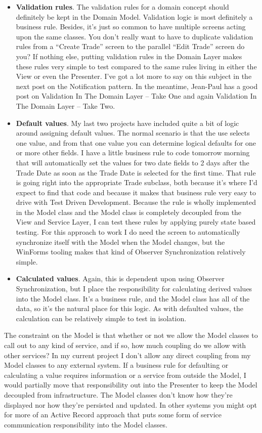 \documentclass{article}
\begin{document}
{\begin{itemize}
    \item  \textbf{Validation rules}.  The validation rules for a domain concept should definitely be kept in the Domain Model.  Validation logic is most definitely a business rule.  Besides, it's just so common to have multiple screens acting upon the same classes.  You don't really want to have to duplicate validation rules from a “Create Trade” screen to the parallel “Edit Trade” screen do you?  If nothing else, putting validation rules in the Domain Layer makes these rules very simple to test compared to the same rules living in either the View or even the Presenter.  I've got a lot more to say on this subject in the next post on the Notification pattern.  In the meantime, Jean-Paul has a good post on Validation In The Domain Layer – Take One and again Validation In The Domain Layer – Take Two.
    \item  \textbf{Default values}.  My last two projects have included quite a bit of logic around assigning default values.  The normal scenario is that the use selects one value, and from that one value you can determine logical defaults for one or more other fields.  I have a little business rule to code tomorrow morning that will automatically set the values for two date fields to 2 days after the Trade Date as soon as the Trade Date is selected for the first time.  That rule is going right into the appropriate Trade subclass, both because it's where I'd expect to find that code and because it makes that business rule very easy to drive with Test Driven Development.  Because the rule is wholly implemented in the Model class and the Model class is completely decoupled from the View and Service Layer, I can test these rules by applying purely state based testing.  For this approach to work I do need the screen to automatically synchronize itself with the Model when the Model changes, but the WinForms tooling makes that kind of Observer Synchronization relatively simple. 
    \item  \textbf{Calculated values}.  Again, this is dependent upon using Observer Synchronization, but I place the responsibility for calculating derived values into the Model class.  It's a business rule, and the Model class has all of the data, so it's the natural place for this logic.  As with defaulted values, the calculation can be relatively simple to test in isolation.
\end{itemize}
 

The constraint on the Model is that whether or not we allow the Model classes to call out to any kind of service, and if so, how much coupling do we allow with other services?  In my current project I don't allow any direct coupling from my Model classes to any external system.  If a business rule for defaulting or calculating a value requires information or a service from outside the Model, I would partially move that responsibility out into the Presenter to keep the Model decoupled from infrastructure.  The Model classes don't know how they're displayed nor how they're persisted and updated.  In other systems you might opt for more of an Active Record approach that puts some form of service communication responsibility into the Model classes. 

}
\end{document}
